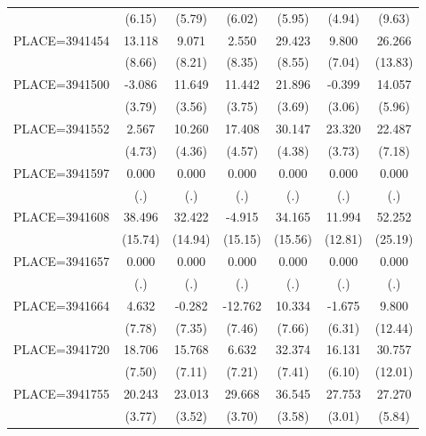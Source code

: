 {\begin{tabular}{l*{6}{c}}
                    &      (6.15)&      (5.79)&      (6.02)&      (5.95)&      (4.94)&      (9.63)\\
PLACE=3941454       &      13.118&       9.071&       2.550&      29.423&       9.800&      26.266\\
                    &      (8.66)&      (8.21)&      (8.35)&      (8.55)&      (7.04)&     (13.83)\\
PLACE=3941500       &      -3.086&      11.649&      11.442&      21.896&      -0.399&      14.057\\
                    &      (3.79)&      (3.56)&      (3.75)&      (3.69)&      (3.06)&      (5.96)\\
PLACE=3941552       &       2.567&      10.260&      17.408&      30.147&      23.320&      22.487\\
                    &      (4.73)&      (4.36)&      (4.57)&      (4.38)&      (3.73)&      (7.18)\\
PLACE=3941597       &       0.000&       0.000&       0.000&       0.000&       0.000&       0.000\\
                    &         (.)&         (.)&         (.)&         (.)&         (.)&         (.)\\
PLACE=3941608       &      38.496&      32.422&      -4.915&      34.165&      11.994&      52.252\\
                    &     (15.74)&     (14.94)&     (15.15)&     (15.56)&     (12.81)&     (25.19)\\
PLACE=3941657       &       0.000&       0.000&       0.000&       0.000&       0.000&       0.000\\
                    &         (.)&         (.)&         (.)&         (.)&         (.)&         (.)\\
PLACE=3941664       &       4.632&      -0.282&     -12.762&      10.334&      -1.675&       9.800\\
                    &      (7.78)&      (7.35)&      (7.46)&      (7.66)&      (6.31)&     (12.44)\\
PLACE=3941720       &      18.706&      15.768&       6.632&      32.374&      16.131&      30.757\\
                    &      (7.50)&      (7.11)&      (7.21)&      (7.41)&      (6.10)&     (12.01)\\
PLACE=3941755       &      20.243&      23.013&      29.668&      36.545&      27.753&      27.270\\
                    &      (3.77)&      (3.52)&      (3.70)&      (3.58)&      (3.01)&      (5.84)\\

\end{tabular}}
